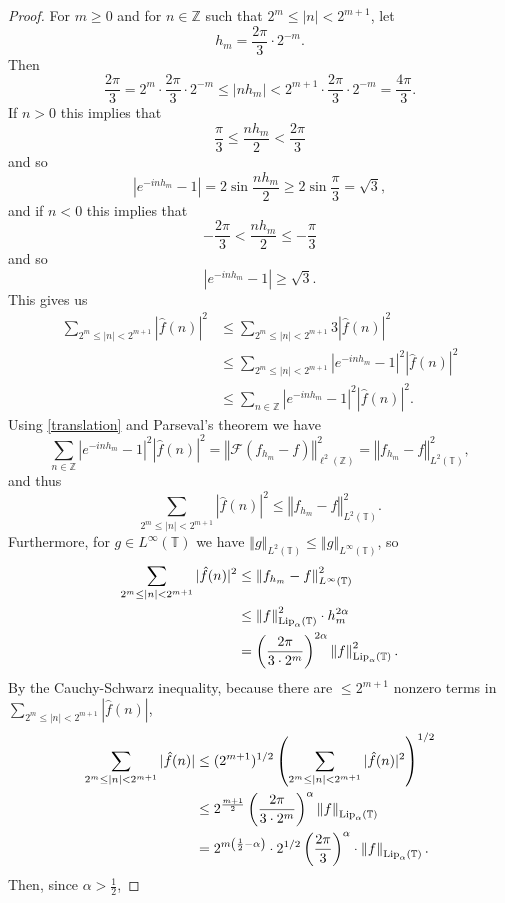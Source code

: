 \documentclass{article}
\newcommand{\Lip}{\ensuremath\mathrm{Lip}}
\newcommand{\norm}[1]{\left\Vert #1 \right\Vert}
\theoremstyle{definition}
\theoremstyle{definition}
\begin{document}
\begin{proof}
For $m \geq 0$ and 
for $n \in \mathbb{Z}$ such that
$2^m \leq |n| < 2^{m+1}$, let 
\[
h_m = \frac{2\pi}{3}\cdot 2^{-m}.
\]
Then
\[
\frac{2\pi}{3} =2^m \cdot  \frac{2\pi}{3}\cdot 2^{-m}   \leq |nh_m| < 2^{m+1} \cdot \frac{2\pi}{3}\cdot 2^{-m} = \frac{4\pi}{3}.
\]
If $n>0$  this implies that
\[
\frac{\pi}{3} \leq \frac{nh_m}{2} < \frac{2\pi}{3} 
\]
and so
\[
|e^{-inh_m}-1| = 2 \sin \frac{nh_m}{2} \geq 2 \sin \frac{\pi}{3} = \sqrt{3},
\]
and if $n<0$ this implies that
\[
-\frac{2\pi}{3} < \frac{nh_m}{2} \leq -\frac{\pi}{3}
\]
and so
\[
|e^{-inh_m}-1| \geq \sqrt{3}.
\]
This gives us
\begin{align*}
\sum_{2^m \leq |n| < 2^{m+1}} |\hat{f}(n)|^2 &\leq \sum_{2^m \leq |n| < 2^{m+1}} 3|\hat{f}(n)|^2\\
&\leq \sum_{2^m \leq |n| < 2^{m+1}}  |e^{-inh_m}-1|^2 |\hat{f}(n)|^2\\
&\leq \sum_{n \in \mathbb{Z}}  |e^{-inh_m}-1|^2 |\hat{f}(n)|^2.
\end{align*}
Using \eqref{translation} and Parseval's theorem we  have
\[
\sum_{n \in \mathbb{Z}}  |e^{-inh_m}-1|^2 |\hat{f}(n)|^2=\norm{\mathscr{F}(f_{h_m}-f)}_{\ell^2(\mathbb{Z})}^2
=\norm{f_{h_m}-f}_{L^2(\mathbb{T})}^2,
\]
and thus
\[
\sum_{2^m \leq |n| < 2^{m+1}} |\hat{f}(n)|^2 \leq \norm{f_{h_m}-f}_{L^2(\mathbb{T})}^2.
\]
Furthermore, for $g \in L^\infty(\mathbb{T})$ we have $\norm{g}_{L^2(\mathbb{T})} \leq \norm{g}_{L^\infty(\mathbb{T})}$, so 
\begin{align*}
\sum_{2^m \leq |n| < 2^{m+1}} |\hat{f}(n)|^2 & \leq \norm{f_{h_m}-f}_{L^\infty(\mathbb{T})}^2\\
&\leq \norm{f}_{\Lip_\alpha(\mathbb{T})}^2 \cdot h_m^{2\alpha}\\
&=\left( \frac{2\pi}{3\cdot 2^m} \right)^{2\alpha} \norm{f}_{\Lip_\alpha(\mathbb{T})}^2.
\end{align*}
By the Cauchy-Schwarz inequality, because there are $\leq 2^{m+1}$ nonzero
terms in $\sum_{2^m \leq |n| < 2^{m+1}} |\hat{f}(n)|$, 
\begin{align*}
\sum_{2^m \leq |n| < 2^{m+1}} |\hat{f}(n)|& \leq (2^{m+1})^{1/2} 
\left( \sum_{2^m \leq |n| < 2^{m+1}} |\hat{f}(n)|^2 \right)^{1/2}\\
&\leq 2^{\frac{m+1}{2}} \left( \frac{2\pi}{3\cdot 2^m} \right)^{\alpha} \norm{f}_{\Lip_\alpha(\mathbb{T})}\\
&=2^{m\left(\frac{1}{2}-\alpha\right)} \cdot 2^{1/2} \left( \frac{2\pi}{3} \right)^\alpha \cdot  \norm{f}_{\Lip_\alpha(\mathbb{T})}.
\end{align*}
Then, since $\alpha>\frac{1}{2}$,

\end{proof}
\end{document}
